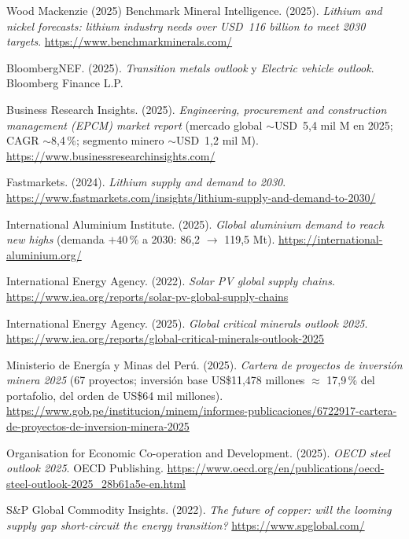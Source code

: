 \documentclass[11pt,letterpaper]{report}
\begin{document}
\begin{thebibliography}{Wood Mackenzie (2025)}
\footnotesize
{} Benchmark Mineral Intelligence. (2025). \textit{Lithium and nickel forecasts: lithium
  industry needs over USD~116 billion to meet 2030 targets}. \url{https://www.benchmarkminerals.com/}

 BloombergNEF. (2025). \textit{Transition metals outlook} y \textit{Electric vehicle outlook}.
  Bloomberg Finance L.P.

 Business Research Insights. (2025). \textit{Engineering, procurement and
  construction management (EPCM) market report} (mercado global $\sim$USD~5{,}4 mil M en 2025; CAGR $\sim$8{,}4\,\%; segmento minero
  $\sim$USD~1{,}2 mil M). \url{https://www.businessresearchinsights.com/}

 Fastmarkets. (2024). \textit{Lithium supply and demand to 2030}.
  \url{https://www.fastmarkets.com/insights/lithium-supply-and-demand-to-2030/}

 International Aluminium Institute. (2025). \textit{Global aluminium demand to reach new highs}
  (demanda $+40\,\%$ a 2030: 86{,}2 $\rightarrow$ 119{,}5 Mt). \url{https://international-aluminium.org/}

 International Energy Agency. (2022). \textit{Solar PV global supply chains}.
  \url{https://www.iea.org/reports/solar-pv-global-supply-chains}

 International Energy Agency. (2025). \textit{Global critical minerals outlook 2025}.
  \url{https://www.iea.org/reports/global-critical-minerals-outlook-2025}

 Ministerio de Energía y Minas del Perú. (2025). \textit{Cartera de proyectos de inversión
  minera 2025} (67 proyectos; inversión base US\$11{,}478 millones $\approx$ 17{,}9\,\% del portafolio, del orden de US\$64 mil
  millones). \url{https://www.gob.pe/institucion/minem/informes-publicaciones/6722917-cartera-de-proyectos-de-inversion-minera-2025}

 Organisation for Economic Co-operation and Development. (2025). \textit{OECD steel outlook
  2025}. OECD Publishing. \url{https://www.oecd.org/en/publications/oecd-steel-outlook-2025_28b61a5e-en.html}

 S\&P Global Commodity Insights. (2022). \textit{The future of copper: will the looming
  supply gap short-circuit the energy transition?} \url{https://www.spglobal.com/}


\end{thebibliography}
\end{document}
